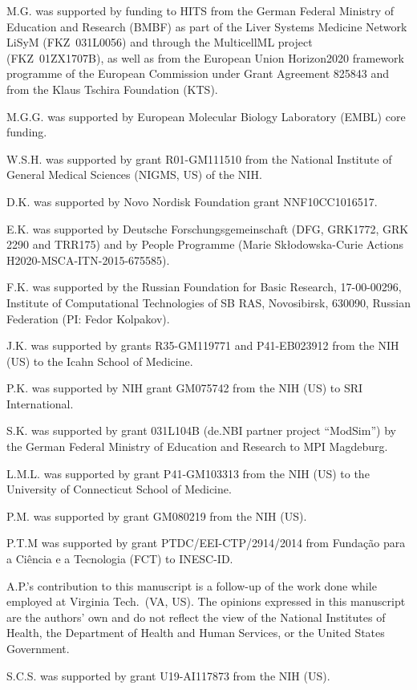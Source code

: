 \documentclass{sbml-paper}
\begin{document}
M.G. was supported by funding to HITS from the German Federal Ministry of Education and Research (BMBF) as part of the Liver Systems Medicine Network LiSyM (FKZ~031L0056) and through the MulticellML project (FKZ~01ZX1707B), as well as from the European Union Horizon2020 framework programme of the European Commission under Grant Agreement 825843 and from the Klaus Tschira Foundation (KTS).

M.G.G. was supported by European Molecular Biology Laboratory (EMBL) core funding.

W.S.H. was supported by grant \No R01-GM111510 from the National Institute of General Medical Sciences (NIGMS, US) of the NIH.

D.K. was supported by Novo Nordisk Foundation grant \No NNF10CC1016517.

E.K. was supported by Deutsche Forschungsgemeinschaft (DFG, GRK1772, GRK 2290 and TRR175) and by People Programme (Marie Skłodowska-Curie Actions H2020-MSCA-ITN-2015-675585).

F.K. was supported by the Russian Foundation for Basic Research, 17-00-00296, Institute of Computational Technologies of SB RAS, Novosibirsk, 630090, Russian Federation (PI: Fedor Kolpakov).

J.K. was supported by grants \No R35-GM119771 and P41-EB023912 from the NIH (US) to the Icahn School of Medicine.

P.K. was supported by NIH grant \No GM075742 from the NIH (US) to SRI International.

S.K. was supported by grant \No 031L104B (de.NBI partner project ``ModSim'') by the German Federal Ministry of Education and Research to MPI Magdeburg.

L.M.L. was supported by grant \No P41-GM103313 from the NIH (US) to the University of Connecticut School of Medicine.

P.M. was supported by grant \No GM080219 from the NIH (US).

P.T.M was supported by grant \No PTDC/EEI-CTP/2914/2014 from Funda\c{c}\~{a}o para a Ci\^{e}ncia e a Tecnologia (FCT) to INESC-ID.

A.P.'s contribution to this manuscript is a follow-up of the work done while employed at Virginia Tech.\ (VA, US). The opinions expressed in this manuscript are the authors' own and do not reflect the view of the National Institutes of Health, the Department of Health and Human Services, or the United States Government.

S.C.S. was supported by grant \No U19-AI117873 from the NIH (US).
\end{document}
